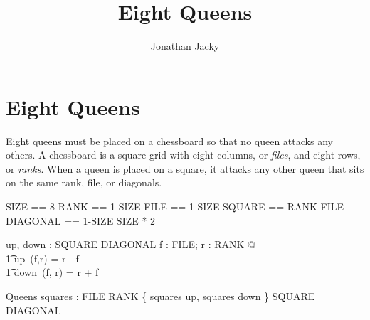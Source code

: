 \documentclass{article}
\title{Eight Queens}
\author{Jonathan Jacky}
\begin{document}
\section{Eight Queens}

Eight queens must be placed on a chessboard so that no queen attacks any others. A chessboard is a square grid with eight columns, or {\em files}, and eight rows, or {\em ranks}. When a queen is placed on a square, it attacks any other queen that sits on the same rank, file, or diagonals.

\begin{zed}
        SIZE == 8 
\also   RANK == 1 \upto SIZE
\also   FILE == 1 \upto SIZE 
\also   SQUARE == RANK \cross FILE
\also   DIAGONAL == 1-SIZE \upto SIZE * 2
\end{zed}

\begin{axdef}
up, down : SQUARE \fun DIAGONAL
\where
\forall f : FILE; r : RANK @ \\
\t1 up\ (f,r) = r - f \land \\
\t1 down\ (f, r) = r + f
\end{axdef}

\begin{schema}{Queens}
  squares : FILE \bij RANK
\where
\{ squares \dres up, squares \dres down \} \subseteq SQUARE \inj DIAGONAL
\end{schema}
\end{document}
